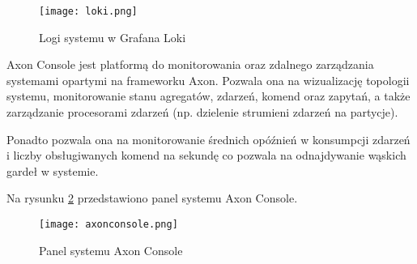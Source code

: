 \begin{figure}[!h]
    \centering \texttt{[image: loki.png]}
    \caption{Logi systemu w Grafana Loki}
    \label{fig:loki}
\end{figure}

Axon Console jest platformą do monitorowania oraz zdalnego zarządzania systemami opartymi na frameworku Axon. Pozwala ona na wizualizację topologii systemu, monitorowanie stanu agregatów, zdarzeń, komend oraz zapytań, a także zarządzanie procesorami zdarzeń (np. dzielenie strumieni zdarzeń na partycje).

Ponadto pozwala ona na monitorowanie średnich opóźnień w konsumpcji zdarzeń i liczby obsługiwanych komend na sekundę co pozwala na odnajdywanie wąskich gardeł w systemie.

Na rysunku \ref{fig:axonconsole} przedstawiono panel systemu Axon Console.

\begin{figure}[!h]
    \centering \texttt{[image: axonconsole.png]}
    \caption{Panel systemu Axon Console}
    \label{fig:axonconsole}
\end{figure}
